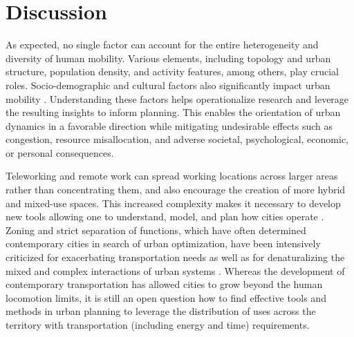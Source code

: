 \section{Discussion}
\label{sec:ETRCO2H_Discussion}

As expected, no single factor can account for the entire heterogeneity and diversity of human mobility. Various elements, including topology and urban structure, population density, and activity features, among others, play crucial roles. Socio-demographic and cultural factors also significantly impact urban mobility \citep{Noulas2012AMobility}. Understanding these factors helps operationalize research and leverage the resulting insights to inform planning. This enables the orientation of urban dynamics in a favorable direction while mitigating undesirable effects such as congestion, resource misallocation, and adverse societal, psychological, economic, or personal consequences.

Teleworking and remote work can spread working locations across larger areas rather than concentrating them, and also encourage the creation of more hybrid and mixed-use spaces. This increased complexity makes it necessary to develop new tools allowing one to understand, model, and plan how cities operate \citep{Camocini2011TeleworkingWorkplace}. Zoning and strict separation of functions, which have often determined contemporary cities in search of urban optimization, have been intensively criticized for exacerbating transportation needs as well as for denaturalizing the mixed and complex interactions of urban systems \citep{Jacobs1961}. Whereas the development of contemporary transportation has allowed cities to grow beyond the human locomotion limits, it is still an open question how to find effective tools and methods in urban planning to leverage the distribution of uses across the territory with transportation (including energy and time) requirements.

